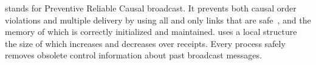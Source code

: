 \RPCBROADCAST stands for Preventive Reliable Causal broadcast. It prevents both
causal order violations and multiple delivery by using all and only links that
are safe~\cite{nedelec2018pcbroadcast}, and the memory of which is correctly
initialized and maintained.  \RPCBROADCAST uses a local structure the size of
which increases and decreases over receipts. Every process safely removes
obsolete control information about past broadcast messages.



